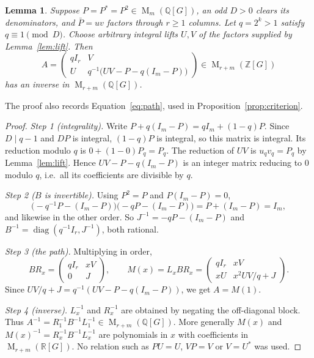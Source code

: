 \documentclass[11pt]{article}
\newtheorem{lemma}[theorem]{Lemma}
\theoremstyle{remark}
\numberwithin{equation}{section}
\newcommand{\Z}{\mathbb Z}
\newcommand{\Q}{\mathbb Q}
\newcommand{\R}{\mathbb R}
\newcommand{\Mat}{\operatorname{M}}
\newcommand{\diag}{\operatorname{diag}}
\begin{document}
\begin{lemma}\label{lem:integral}
Suppose $P=P^*=P^2\in\Mat_m(\Q[G])$, an odd $D>0$ clears its
denominators, and $\bar P=uv$ factors through $r\ge1$ columns.
Let $q=2^k>1$ satisfy $q\equiv1\pmod D$. Choose arbitrary
integral lifts $U,V$ of the factors supplied by Lemma~\ref{lem:lift}.
Then
\begin{equation}\label{eq:integral-matrix}
 A=\begin{pmatrix}
 qI_r&V\\
 U&q^{-1}\bigl(UV-P-q(I_m-P)\bigr)
 \end{pmatrix}
 \in\Mat_{r+m}(\Z[G])
\end{equation}
has an inverse in $\Mat_{r+m}(\Q[G])$.
\end{lemma}

The proof also records Equation~\eqref{eq:path}, used in Proposition~\ref{prop:criterion}.

\begin{proof}
\emph{Step 1 (integrality).} Write $P+q(I_m-P)=qI_m+(1-q)P$. Since $D\mid q-1$ and $DP$ is integral, $(1-q)P$ is integral, so this matrix is integral. Its reduction modulo $q$ is $0+(1-0)P_q=P_q$. The reduction of $UV$ is $u_qv_q=P_q$ by Lemma~\ref{lem:lift}. Hence $UV-P-q(I_m-P)$ is an integer matrix reducing to $0$ modulo $q$, i.e.\ all its coefficients are divisible by $q$.

\emph{Step 2 ($B$ is invertible).} Using $P^2=P$ and $P(I_m-P)=0$,
\[
 \bigl(-q^{-1}P-(I_m-P)\bigr)\bigl(-qP-(I_m-P)\bigr)=P+(I_m-P)=I_m ,
\]
and likewise in the other order. So $J^{-1}=-qP-(I_m-P)$ and $B^{-1}=\diag(q^{-1}I_r,J^{-1})$, both rational.

\emph{Step 3 (the path).} Multiplying in order,
\begin{equation}\label{eq:path}
 BR_x=\begin{pmatrix}qI_r&xV\\0&J\end{pmatrix},\qquad
 M(x)=L_xBR_x=
 \begin{pmatrix}qI_r&xV\\xU&x^2UV/q+J\end{pmatrix}.
\end{equation}
Since $UV/q+J=q^{-1}(UV-P-q(I_m-P))$, we get $A=M(1)$.

\emph{Step 4 (inverse).} $L_x^{-1}$ and $R_x^{-1}$ are obtained by negating the off-diagonal block. Thus $A^{-1}=R_1^{-1}B^{-1}L_1^{-1}\in\Mat_{r+m}(\Q[G])$. More generally $M(x)$ and $M(x)^{-1}=R_x^{-1}B^{-1}L_x^{-1}$ are polynomials in $x$ with coefficients in $\Mat_{r+m}(\R[G])$. No relation such as $PU=U$, $VP=V$ or $V=U^*$ was used.
\end{proof}
\end{document}
